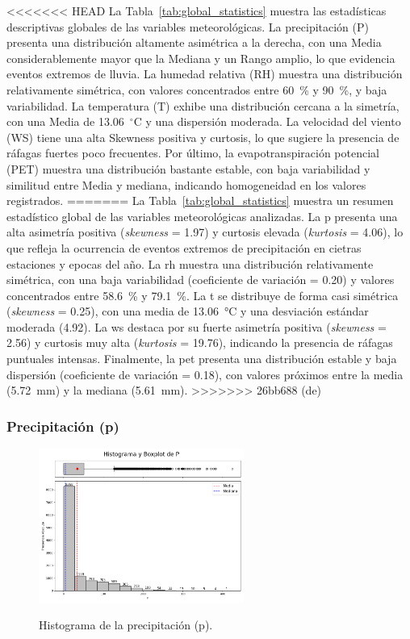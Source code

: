 <<<<<<< HEAD
La Tabla~\ref{tab:global_statistics} muestra las estadísticas descriptivas globales de las variables meteorológicas. La precipitación (P) presenta una distribución altamente asimétrica a la derecha, con una Media considerablemente mayor que la Mediana y un Rango amplio, lo que evidencia eventos extremos de lluvia. La humedad relativa (RH) muestra una distribución relativamente simétrica, con valores concentrados entre 60~\% y 90~\%, y baja variabilidad. La temperatura (T) exhibe una distribución cercana a la simetría, con una Media de 13.06~$^\circ$C y una dispersión moderada. La velocidad del viento (WS) tiene una alta Skewness positiva y curtosis, lo que sugiere la presencia de ráfagas fuertes poco frecuentes. Por último, la evapotranspiración potencial (PET) muestra una distribución bastante estable, con baja variabilidad y similitud entre Media y mediana, indicando homogeneidad en los valores registrados.
=======
La Tabla~\ref{tab:global_statistics} muestra un resumen estadístico global de las variables meteorológicas analizadas. La \gls{p} presenta una alta asimetría positiva (\textit{skewness} = 1.97) y curtosis elevada (\textit{kurtosis} = 4.06), lo que refleja la ocurrencia de eventos extremos de precipitación en cietras estaciones y epocas del año. La \gls{rh} muestra una distribución relativamente simétrica, con una baja variabilidad (coeficiente de variación = 0.20) y valores concentrados entre 58.6~\% y 79.1~\%. La \gls{t} se distribuye de forma casi simétrica (\textit{skewness} = 0.25), con una media de 13.06~\si{\celsius} y una desviación estándar moderada (4.92). La \gls{ws} destaca por su fuerte asimetría positiva (\textit{skewness} = 2.56) y curtosis muy alta (\textit{kurtosis} = 19.76), indicando la presencia de ráfagas puntuales intensas. Finalmente, la \gls{pet} presenta una distribución estable y baja dispersión (coeficiente de variación = 0.18), con valores próximos entre la media (5.72~mm) y la mediana (5.61~mm).
>>>>>>> 26bb688 (de)

\subsubsection*{Precipitación (\gls{p})}

\begin{figure}[htbp]
    \centering
    \caption{Histograma de la precipitación (\gls{p}).}
    \includegraphics[width=0.6\textwidth]{resultados/global/univariado/P_histograma.png}
    \label{fig:P_histograma}
\end{figure}

